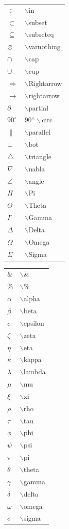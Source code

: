 \begin{tabular}{ll}
$\in$ &  $\backslash$in \\
$\subset $ &  $\backslash$subset \\
$\subseteq $ &  $\backslash$subseteq \\
$\varnothing $ &  $\backslash$varnothing  \\
$\cap $ &  $\backslash$cap \\
$\cup $ &  $\backslash$cup \\
$\Rightarrow$ &  $\backslash$Rightarrow \\
$\rightarrow$ &  $\backslash$rightarrow \\
$\partial$ &  $\backslash$partial \\
$90^\circ$ &  90$^\wedge\backslash$circ \\
$\parallel$ &  $\backslash$parallel \\
$\bot$ &  $\backslash$bot \\
$\triangle$ &  $\backslash$triangle \\
$\nabla$ &   $\backslash$nabla \\
$\angle$ &  $\backslash$angle \\
$\Pi$ &  $\backslash$Pi \\
$\Theta$ &  $\backslash$Theta \\
$\Gamma$ &  $\backslash$Gamma \\
$\Delta$ &  $\backslash$Delta \\
$\Omega$ &  $\backslash$Omega \\
$\Sigma$ &  $\backslash$Sigma \\
\end{tabular}
\hspace*{1ex}
\begin{tabular}{l l}
\& & $\backslash$\& \\
\% & $\backslash$\% \\
$\alpha$ &  $\backslash$alpha \\
$\beta$ &  $\backslash$beta \\
$\epsilon$ &  $\backslash$epsilon \\
$\zeta$ &  $\backslash$zeta \\
$\eta$ &  $\backslash$eta \\
$\kappa$ &  $\backslash$kappa \\
$\lambda$ &  $\backslash$lambda \\
$\mu$ &  $\backslash$mu \\
$\xi$ &  $\backslash$xi \\
$\rho$ &  $\backslash$rho \\
$\tau$ &  $\backslash$tau \\
$\phi$ &  $\backslash$phi \\
$\psi$ &  $\backslash$psi \\
$\pi$ &  $\backslash$pi \\
$\theta$ &  $\backslash$theta \\
$\gamma$ &  $\backslash$gamma\\
$\delta$ &  $\backslash$delta \\
$\omega$ &  $\backslash$omega \\
$\sigma$ &  $\backslash$sigma \\
\end{tabular}
 

\newpage
